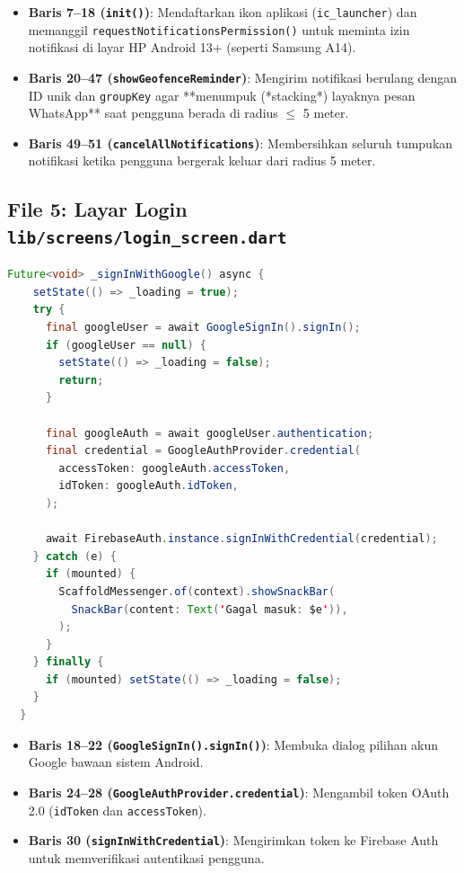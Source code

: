 \documentclass[12pt,a4paper]{article}
\begin{document}
\begin{highlightbox}
\begin{itemize}[leftmargin=*]
    \item \textbf{Baris 7--18 (\texttt{init()})}: Mendaftarkan ikon aplikasi (\texttt{ic\_launcher}) dan memanggil \texttt{requestNotificationsPermission()} untuk meminta izin notifikasi di layar HP Android 13+ (seperti Samsung A14).
    \item \textbf{Baris 20--47 (\texttt{showGeofenceReminder})}: Mengirim notifikasi berulang dengan ID unik dan \texttt{groupKey} agar **menumpuk (*stacking*) layaknya pesan WhatsApp** saat pengguna berada di radius $\le$ 5 meter.
    \item \textbf{Baris 49--51 (\texttt{cancelAllNotifications})}: Membersihkan seluruh tumpukan notifikasi ketika pengguna bergerak keluar dari radius 5 meter.
\end{itemize}
\end{highlightbox}

\newpage
\subsection{File 5: Layar Login \texttt{lib/screens/login\_screen.dart}}

\begin{lstlisting}[language=Java, firstnumber=15, caption=lib/screens/login\_screen.dart]
  Future<void> _signInWithGoogle() async {
    setState(() => _loading = true);
    try {
      final googleUser = await GoogleSignIn().signIn();
      if (googleUser == null) {
        setState(() => _loading = false);
        return;
      }

      final googleAuth = await googleUser.authentication;
      final credential = GoogleAuthProvider.credential(
        accessToken: googleAuth.accessToken,
        idToken: googleAuth.idToken,
      );

      await FirebaseAuth.instance.signInWithCredential(credential);
    } catch (e) {
      if (mounted) {
        ScaffoldMessenger.of(context).showSnackBar(
          SnackBar(content: Text('Gagal masuk: $e')),
        );
      }
    } finally {
      if (mounted) setState(() => _loading = false);
    }
  }
\end{lstlisting}

\begin{highlightbox}
\begin{itemize}[leftmargin=*]
    \item \textbf{Baris 18--22 (\texttt{GoogleSignIn().signIn()})}: Membuka dialog pilihan akun Google bawaan sistem Android.
    \item \textbf{Baris 24--28 (\texttt{GoogleAuthProvider.credential})}: Mengambil token OAuth 2.0 (\texttt{idToken} dan \texttt{accessToken}).
    \item \textbf{Baris 30 (\texttt{signInWithCredential})}: Mengirimkan token ke Firebase Auth untuk memverifikasi autentikasi pengguna.
\end{itemize}
\end{highlightbox}
\end{document}
